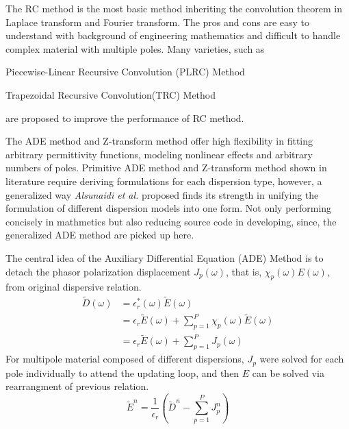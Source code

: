 The RC method is the most basic method inheriting the convolution theorem in Laplace transform and Fourier
transform. The pros and cons are easy to understand with background of engineering mathematics and difficult to handle
complex material with multiple poles. Many varieties, such as
\begin{inparaenum}[(1)]
\item Piecewise-Linear Recursive Convolution (PLRC) Method
\item Trapezoidal Recursive Convolution(TRC) Method
\end{inparaenum} are proposed to improve the performance of RC method.


The ADE method and Z-transform method offer high flexibility in fitting arbitrary permittivity functions, modeling
nonlinear effects and arbitrary numbers of poles. Primitive ADE method and Z-transform method shown in literature
require deriving formulations for each dispersion type, however, a generalized way \textit{Alsunaidi et al.} proposed
finds its strength in unifying the formulation of different dispersion models into one form. Not only performing
concisely in mathmetics but also reducing source code in developing, since, the generalized ADE method are picked up
here.

The central idea of the Auxiliary Differential Equation (ADE) Method is to detach the phasor polarization displacement
$J_p(\omega)$, that is, $\chi_p(\omega)E(\omega)$, from original dispersive relation.
\begin{equation}
  \begin{split}
    \widetilde{D}(\omega) &= \epsilon_r^*(\omega)\widetilde{E}(\omega)\\
    & = \epsilon_r\widetilde{E}(\omega) + \sum_{p=1}^P\chi_p(\omega)\widetilde{E}(\omega)\\
    & = \epsilon_r\widetilde{E}(\omega) + \sum_{p=1}^{P}J_p(\omega)
  \end{split}
\end{equation}
For multipole material composed of different dispersions, $J_p$ were solved for each pole individually to attend the
updating loop, and then $E$ can be solved via rearrangment of previous relation.
\begin{equation}
  \widetilde{E}^n = \frac{1}{\epsilon_r}\left(\widetilde{D}^n - \sum_{p=1}^PJ_p^n\right)
\end{equation}

